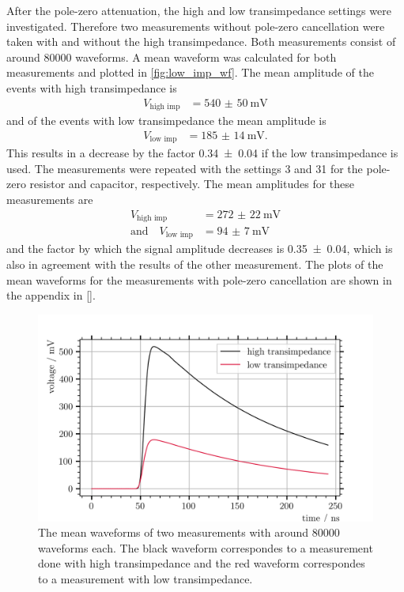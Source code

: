After the pole-zero attenuation, the high and low transimpedance settings were investigated.
Therefore two measurements without pole-zero cancellation were taken with and without the high transimpedance.
Both measurements consist of around \num{80000} waveforms.
A mean waveform was calculated for both measurements and plotted in \autoref{fig:low_imp_wf}.
The mean amplitude of the events with high transimpedance is
\begin{align}
	V_\text{high imp} &= \SI{540(50)}{\milli\volt}
\end{align}
and of the events with low transimpedance the mean amplitude is
\begin{align}
	V_\text{low imp} &= \SI{185(14)}{\milli\volt}.
\end{align}
This results in a decrease by the factor \num{0.34(4)} if the low transimpedance is used.
The measurements were repeated with the settings 3 and 31 for the pole-zero resistor and capacitor, respectively.
The mean amplitudes for these measurements are
\begin{align}
	V_\text{high imp} &= \SI{272(22)}{\milli\volt}\\
	\text{and}\quad V_\text{low imp} &= \SI{94(7)}{\milli\volt}
\end{align}
and the factor by which the signal amplitude decreases is \num{0.35(4)}, which is also in agreement with the results of the other measurement.
The plots of the mean waveforms for the measurements with pole-zero cancellation are shown in the appendix in \autoref{}.
\begin{figure}
	\centering
	\includegraphics[width=1.\textwidth]{pictures/low_imp_mean_wf}
	\caption[Waveforms measured with low and high transimpedance]{The mean waveforms of two measurements with around \num{80000} waveforms each. The black waveform correspondes to a measurement done with high transimpedance and the red waveform correspondes to a measurement with low transimpedance.}
	\label{fig:low_imp_wf}
\end{figure}


